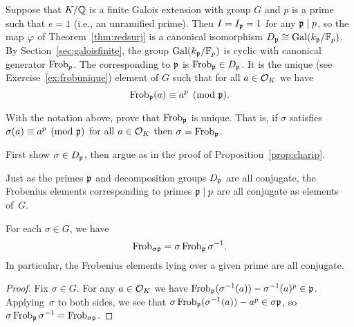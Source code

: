 Suppose that $K/\mathbb{Q}$ is a finite Galois extension with group $G$ and
$p$ is a prime such that $e=1$ (i.e., an unramified prime).  Then
$I=I_{\mathfrak{p}}=1$ for any $\mathfrak{p}\mid p$, so the map $\varphi$ of
Theorem~\ref{thm:redsurj}
is a canonical isomorphism $D_{\mathfrak{p}} \cong \operatorname{Gal}( k_{\mathfrak{p}}/\mathbb{F}_p)$.
By Section~\ref{sec:galoisfinite},
the group $\operatorname{Gal}( k_{\mathfrak{p}}/\mathbb{F}_p)$ is
cyclic with canonical generator $\operatorname{Frob}_p$.
The  corresponding to $\mathfrak{p}$ is
$\operatorname{Frob}_{\mathfrak{p}}\in D_{\mathfrak{p}}$. It is the unique (see Exercise~\ref{ex:frobunique})
element of $G$ such that for all
$a\in\mathcal{O}_K$ we have
$$
  \operatorname{Frob}_{\mathfrak{p}}(a)\equiv a^p\pmod{\mathfrak{p}}.
$$


\begin{exercise}\label{ex:frobunique}
	With the notation above, prove that $\operatorname{Frob}_{\mathfrak{p}}$ is
	unique. That is, if $\sigma$ satisfies
	$\sigma(a) \equiv a^p \pmod{\mathfrak{p}}$ for all $a\in\mathcal{O}_K$
	then $\sigma = \operatorname{Frob}_{\mathfrak{p}}$.

	\begin{hint}
		First show $\sigma\in D_{\mathfrak{p}}$, then argue as in
		the proof of Proposition~\ref{prop:charip}.
	\end{hint}
\end{exercise}


Just as the primes $\mathfrak{p}$ and decomposition groups $D_{\mathfrak{p}}$ are all
conjugate, the Frobenius elements corresponding to primes
$\mathfrak{p}\mid p$ are all conjugate as elements of~$G$.

\begin{proposition}
For each $\sigma \in G$, we have
$$
 \operatorname{Frob}_{\sigma\mathfrak{p}} = \sigma\operatorname{Frob}_{\mathfrak{p}}\sigma^{-1}.
$$
In particular, the Frobenius elements lying over a given
prime are all conjugate.
\end{proposition}
\begin{proof}
Fix $\sigma\in G$. For any $a\in\mathcal{O}_K$ we have
$\operatorname{Frob}_{\mathfrak{p}}(\sigma^{-1}(a)) - \sigma^{-1}(a)^p \in \mathfrak{p}$.
Applying~$\sigma$ to both sides, we see that
$\sigma\operatorname{Frob}_{\mathfrak{p}}(\sigma^{-1}(a)) - a^p \in \sigma\mathfrak{p}$,
so $\sigma\operatorname{Frob}_{\mathfrak{p}}\sigma^{-1} = \operatorname{Frob}_{\sigma \mathfrak{p}}$.
\end{proof}

